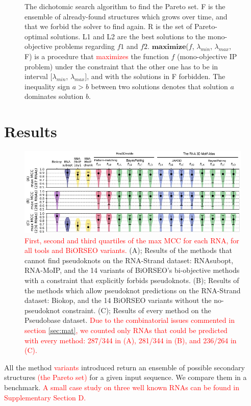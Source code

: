 \documentclass{bioinfo}
\begin{document}
\begin{methods}
\begin{figure}[!tbp]
\caption{The dichotomic search algorithm to find the Pareto set. F is the ensemble of already-found structures which grows over time, and that we forbid the solver to find again. R is the set of Pareto-optimal solutions. L1 and L2 are the best solutions to the mono-objective problems regarding $f1$ and $f2$. $\mathbf{maximize}$($f$, $\lambda_{min}$, $\lambda_{max}$, F) is a procedure that \textcolor{red}{maximizes} the function $f$ (mono-objective IP problem) under the constraint that the other one has to be in interval $[\lambda_{min}$, $\lambda_{max}]$, and with the solutions in F forbidden. The inequality sign $a>b$ between two solutions denotes that solution $a$ dominates solution $b$.}\label{fig:findP}
\end{figure}
\end{methods}

\section{Results}\label{sec:results}
\begin{figure}[!tbp]
   \includegraphics[width=\textwidth]{Benchmark_unconstrained.jpg}
   \caption{\textcolor{red}{First, second and third quartiles of the max MCC for each RNA, for all tools and BiORSEO variants.} 
   (A); Results of the methods that cannot find pseudoknots on the RNA-Strand dataset: RNAsubopt, RNA-MoIP, and the 14 variants of BiORSEO's bi-objective methods with a constraint that explicitly forbids pseudoknots. 
   (B); Results of the methods which allow pseudoknot predictions on the RNA-Strand dataset: Biokop, and the 14 BiORSEO variants without the no-pseudoknot constraint. 
   (C); Results of every method on the Pseudobase dataset. 
   \textcolor{red}{Due to the combinatorial issues commented in section \ref{sec:mat}, we counted only RNAs that could be predicted with every method: 287/344 in (A), 281/344 in (B), and 236/264 in (C).}}
   \label{fig:benchmark}
\end{figure}
All the method \textcolor{red}{variants} introduced return an ensemble of possible secondary structures \textcolor{red}{(the Pareto set)} for a given input sequence. 
We compare them in a benchmark. \textcolor{red}{A small case study on three well known RNAs can be found in Supplementary Section D.}
\end{document}
